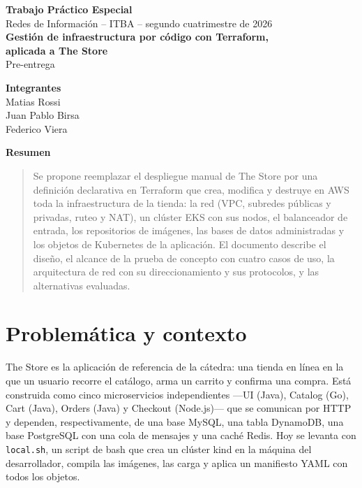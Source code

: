 \documentclass[11pt,a4paper]{article}
\newcommand{\code}[1]{\texttt{#1}}
\begin{document}
\begin{center}
\vspace*{2.2cm}
{\LARGE\bfseries Trabajo Práctico Especial}\\[6pt]
{\large Redes de Información -- ITBA -- segundo cuatrimestre de 2026}\\[22pt]
{\Large\bfseries Gestión de infraestructura por código con Terraform,\\[3pt]
aplicada a The Store}\\[10pt]
{\large Pre-entrega}

\vspace{1.8cm}
{\bfseries Integrantes}\\[6pt]
Matias Rossi\\
Juan Pablo Birsa\\
Federico Viera
\end{center}

\vspace{2cm}
\begin{center}\bfseries Resumen\end{center}
\begin{quote}
Se propone reemplazar el despliegue manual de The Store por una definición declarativa en
Terraform que crea, modifica y destruye en AWS toda la infraestructura de la tienda: la red
(VPC, subredes públicas y privadas, ruteo y NAT), un clúster EKS con sus nodos, el balanceador
de entrada, los repositorios de imágenes, las bases de datos administradas y los objetos de
Kubernetes de la aplicación. El documento describe el diseño, el alcance de la prueba de
concepto con cuatro casos de uso, la arquitectura de red con su direccionamiento y sus
protocolos, y las alternativas evaluadas.
\end{quote}
\newpage

\section{Problemática y contexto}

The Store es la aplicación de referencia de la cátedra: una tienda en línea en la que un
usuario recorre el catálogo, arma un carrito y confirma una compra. Está construida como
cinco microservicios independientes ---UI (Java), Catalog (Go), Cart (Java), Orders (Java) y
Checkout (Node.js)--- que se comunican por HTTP y dependen, respectivamente, de una base
MySQL, una tabla DynamoDB, una base PostgreSQL con una cola de mensajes y una caché Redis. Hoy
se levanta con \code{local.sh}, un script de bash que crea un clúster kind en la máquina del
desarrollador, compila las imágenes, las carga y aplica un manifiesto YAML con todos los
objetos.
\end{document}
